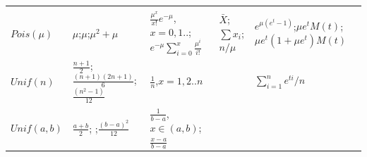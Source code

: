 \documentclass[10pt,twocolumn,portrait]{article}
\begin{document}
\begin{longtable}[]{@{}lllll@{}}
\begin{minipage}[t]{0.13\columnwidth}
\strut
\end{minipage} & \begin{minipage}[t]{0.26\columnwidth}\raggedright
\strut
\end{minipage}\tabularnewline
\begin{minipage}[t]{0.07\columnwidth}\raggedright
\(Pois(\mu)\)\strut
\end{minipage} & \begin{minipage}[t]{0.20\columnwidth}\raggedright
\(\mu\);\(\mu\);\(\mu^2+\mu\)\strut
\end{minipage} & \begin{minipage}[t]{0.20\columnwidth}\raggedright
\(\frac{\mu^x}{x!}e^{-\mu}\),\(x=0,1..\);\(e^{-\mu}\sum_{i=0}^x\frac{\mu^i}{i!}\)\strut
\end{minipage} & \begin{minipage}[t]{0.13\columnwidth}\raggedright
\(\bar X\);\(\sum x_i\);\(n/\mu\)\strut
\end{minipage} & \begin{minipage}[t]{0.26\columnwidth}\raggedright
\(e^{\mu(e^t-1)}\);\(\mu e^tM(t)\);\(\mu e^t(1+\mu e^t)M(t)\)\strut
\end{minipage}\tabularnewline
\begin{minipage}[t]{0.07\columnwidth}\raggedright
\(Unif(n)\)\strut
\end{minipage} & \begin{minipage}[t]{0.20\columnwidth}\raggedright
\(\frac{n+1}2\);\(\frac{(n+1)(2n+1)}{6}\);\(\frac{(n^2-1)}{12}\)\strut
\end{minipage} & \begin{minipage}[t]{0.20\columnwidth}\raggedright
\(\frac{1}n\),\(x=1,2..n\)\strut
\end{minipage} & \begin{minipage}[t]{0.13\columnwidth}\raggedright
\strut
\end{minipage} & \begin{minipage}[t]{0.26\columnwidth}\raggedright
\(\sum_{i=1}^n{e^{ti}}/n\)\strut
\end{minipage}\tabularnewline
\begin{minipage}[t]{0.07\columnwidth}\raggedright
\(Unif(a,b)\)\strut
\end{minipage} & \begin{minipage}[t]{0.20\columnwidth}\raggedright
\(\frac{a+b}{2}\); ;\(\frac{(b-a)^2}{12}\)\strut
\end{minipage} & \begin{minipage}[t]{0.20\columnwidth}\raggedright
\(\frac{1}{b-a}\),\(x\in(a,b)\);\(\frac{x-a}{b-a}\)\strut

\end{minipage}
\end{longtable}
\end{document}
